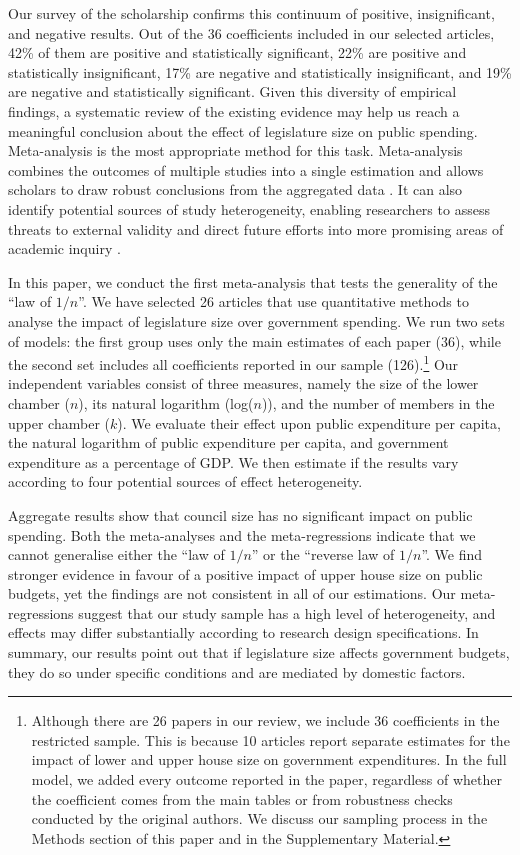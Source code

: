 \documentclass[a4paper,12pt]{article}
\begin{document}
Our survey of the scholarship confirms this continuum of positive,
insignificant, and negative results. Out of the 36 coefficients included in our
selected articles, 42\% of them are positive and statistically significant, 22\%
are positive and statistically insignificant, 17\% are negative and
statistically insignificant, and 19\% are negative and statistically
significant. Given this diversity of empirical findings, a systematic review of
the existing evidence may help us reach a meaningful conclusion about the effect
of legislature size on public spending. Meta-analysis is the most appropriate
method for this task. Meta-analysis combines the outcomes of multiple studies
into a single estimation and allows scholars to draw robust conclusions from the
aggregated data \citep{cooper2019handbook,hedges1985statistical}. It can also
identify potential sources of study heterogeneity, enabling researchers to
assess threats to external validity and direct future efforts into more
promising areas of academic inquiry \citep{doucouliagos2008democracy}.

In this paper, we conduct the first meta-analysis that tests the generality of
the ``law of $1/n$''. We have selected 26 articles that use quantitative methods
to analyse the impact of legislature size over government spending. We run two
sets of models: the first group uses only the main estimates of each paper (36),
while the second set includes all coefficients reported in our sample
(126).\footnote{Although there are 26 papers in our review, we include 36
coefficients in the restricted sample. This is because 10 articles report
separate estimates for the impact of lower and upper house size on government
expenditures. In the full model, we added every outcome reported in the
paper, regardless of whether the coefficient comes from the main tables or
from robustness checks conducted by the original authors. We discuss our
sampling process in the Methods section of this paper and in the Supplementary
Material.} Our independent variables consist of three measures, namely the size
of the lower chamber ($n$), its natural logarithm (log($n$)), and the number of
members in the upper chamber ($k$). We evaluate their effect upon public
expenditure per capita, the natural logarithm of public expenditure per capita,
and government expenditure as a percentage of GDP. We then estimate if the
results vary according to four potential sources of effect heterogeneity.

Aggregate results show that council size has no significant impact on public
spending. Both the meta-analyses and the meta-regressions indicate that we
cannot generalise either the ``law of $1/n$'' or the ``reverse law of $1/n$''.
We find stronger evidence in favour of a positive impact of upper house size on
public budgets, yet the findings are not consistent in all of our estimations.
Our meta-regressions suggest that our study sample has a high level of
heterogeneity, and effects may differ substantially according to research design
specifications. In summary, our results point out that if legislature size
affects government budgets, they do so under specific conditions and are
mediated by domestic factors.
\end{document}

